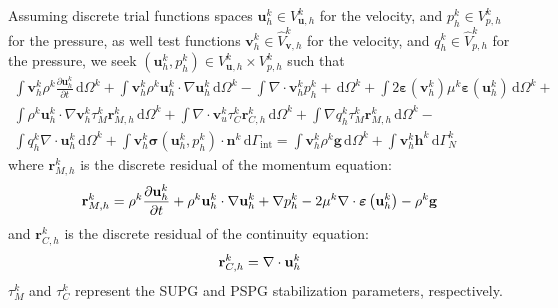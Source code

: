 Assuming discrete trial functions spaces $\mathbf{u}^{k}_{h} \in V_{\mathbf{u},h}^{k}$ for the velocity, and $p^{k}_{h} \in V_{p,h}^{k}$ for the pressure, as well test functions $\mathbf{v}^{k}_{h} \in \hat{V}_{\mathbf{v},h}^{k}$ for the velocity, and $q^{k}_{h} \in \hat{V}_{p,h}^{k}$ for the pressure, we seek $\left(\mathbf{u}^{k}_{h}, p^{k}_{h}\right) \in V^{k}_{\mathbf{u},h} \times V_{p,h}^{k}$ such that
%
\begin{multline}
	\label{eq:incompressible_Navier_Stokes_stabilization}
	\int \mathbf{v}^{k}_{h} \rho^{k} \frac{\partial \mathbf{u}^{k}_h}{\partial t} \, \mathrm{d}\Omega^{k} + 
	\int \mathbf{v}^{k}_{h} \rho^{k} \mathbf{u}^{k}_{h} \cdot \nabla \mathbf{u}^{k}_{h} \, \mathrm{d}\Omega^{k} - 
	\int \nabla \cdot \mathbf{v}^{k}_{h} p^{k}_{h} +  \, \mathrm{d}\Omega^{k} + 
	\int 2 \boldsymbol{\varepsilon} \left( \mathbf{v}^{k}_{h} \right) \mu^{k} \boldsymbol {\varepsilon} \left( \mathbf{u}^{k}_{h} \right) \, \mathrm{d}\Omega^{k} + \\
	\int \rho^{k} \mathbf{u}^{k}_{h} \cdot \nabla \mathbf{v}^{k}_{h} \tau^{k}_{M} \mathbf{r}^{k}_{M,h} \, \mathrm{d}\Omega^{k} + \int \nabla \cdot \mathbf{v}^{k}_{u} \tau^{k}_{C} \mathbf{r}^{k}_{C,h} \, \mathrm{d}\Omega^{k} + 
	\int \nabla q^{k}_{h} \tau^{k}_{M} \mathbf{r}^{k}_{M,h} \, \mathrm{d}\Omega^{k} - \\
	\int q^{k}_{h} \nabla \cdot \mathbf{u}^{k}_{h} \, \mathrm{d}\Omega^{k} + \int \mathbf{v}^{k}_{h} \boldsymbol{\sigma}\left( \mathbf{u}^{k}_{h}, p^{k}_{h} \right) \cdot \mathbf{n}^{k} \, \mathrm{d}\Gamma_{\mathrm{int}} = \int \mathbf{v}^{k}_{h} \rho^{k} \mathbf{g} \, \mathrm{d}\Omega^{k} + \int \mathbf{v}^{k}_{h} \mathbf{h}^{k} \, \mathrm{d}\Gamma^{k}_{N}
\end{multline}
%
\noindent
where $\mathbf{r}^{k}_{M,h}$ is the discrete residual of the momentum equation:
%
\begin{equation}
	\centering
	\label{eq:discrete_residual_momentum}
	\mathbf{r}^{k}_{M,h} = \rho^{k} \frac{\partial \mathbf{u}^{k}_h}{\partial t} + \rho^{k} \mathbf{u}^{k}_{h} \cdot \nabla \mathbf{u}^{k}_{h} + \nabla p^{k}_{h} - 2\mu^{k} \nabla \cdot \boldsymbol{\varepsilon}\left( \mathbf{u}^{k}_{h} \right) - \rho^{k} \mathbf{g}
\end{equation}
%
\noindent
and $\mathbf{r}^{k}_{C,h}$ is the discrete residual of the continuity equation:
%
\begin{equation}
	\centering
	\label{eq:discrete_residual_continuity}
	\mathbf{r}^{k}_{C,h} = \nabla \cdot \mathbf{u}^{k}_{h}
\end{equation}
%
\noindent
$\tau^{k}_{M}$ and $\tau^{k}_{C}$ represent the SUPG and PSPG stabilization parameters, respectively.

